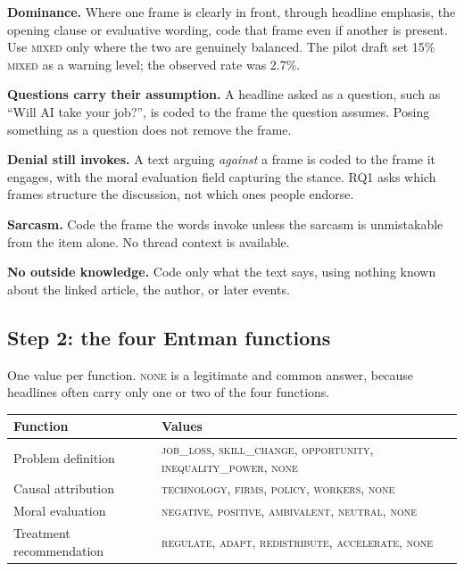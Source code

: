 \begin{description}[leftmargin=2.6em,style=nextline,nosep]
  \item[R1] \textbf{Dominance.} Where one frame is clearly in front, through
        headline emphasis, the opening clause or evaluative wording, code that
        frame even if another is present. Use \textsc{mixed} only where the two
        are genuinely balanced. The pilot draft set 15\% \textsc{mixed} as a
        warning level; the observed rate was 2.7\%.
  \item[R2] \textbf{Questions carry their assumption.} A headline asked as a
        question, such as ``Will AI take your job?'', is coded to the frame the
        question assumes. Posing something as a question does not remove the
        frame.
  \item[R3] \textbf{Denial still invokes.} A text arguing \emph{against} a frame
        is coded to the frame it engages, with the moral evaluation field
        capturing the stance. RQ1 asks which frames structure the discussion,
        not which ones people endorse.
  \item[R4] \textbf{Sarcasm.} Code the frame the words invoke unless the sarcasm
        is unmistakable from the item alone. No thread context is available.
  \item[R5] \textbf{No outside knowledge.} Code only what the text says, using
        nothing known about the linked article, the author, or later events.
\end{description}

\subsection{Step 2: the four Entman functions}

One value per function. \textsc{none} is a legitimate and common answer, because
headlines often carry only one or two of the four functions.

\begin{table}[htbp]\centering
\small
\begin{tabular}{ll}
\toprule
Function & Values\\
\midrule
Problem definition       & \textsc{job\_loss}, \textsc{skill\_change}, \textsc{opportunity}, \textsc{inequality\_power}, \textsc{none}\\
Causal attribution       & \textsc{technology}, \textsc{firms}, \textsc{policy}, \textsc{workers}, \textsc{none}\\
Moral evaluation         & \textsc{negative}, \textsc{positive}, \textsc{ambivalent}, \textsc{neutral}, \textsc{none}\\
Treatment recommendation & \textsc{regulate}, \textsc{adapt}, \textsc{redistribute}, \textsc{accelerate}, \textsc{none}\\
\bottomrule
\end{tabular}
\end{table}

